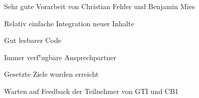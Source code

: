 {
\begin{itemgroup}{}
   \item Sehr gute Vorarbeit von Christian Fehler und Benjamin Mies
   \begin{itemgroup}{}
      \item Relativ einfache Integration neuer Inhalte
      \item Gut lesbarer Code
   \end{itemgroup}

   \item Immer verf"ugbare Ansprechpartner
   
   \item Gesetzte Ziele wurden erreicht
   
   \item Warten auf Feedback der Teilnehmer von GTI und CB1

\end{itemgroup}
\vfill
}
